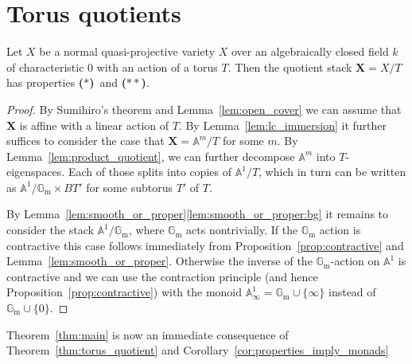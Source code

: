 \documentclass{oupau}
\theoremstyle{remark}
\newcommand\as[2][]{\mathbb A^{#2}_{#1}}    %
\newcommand\Gm{\mathbb{G}_{\mathrm{m}}}     %
\let\stack\mathbf                           %
\newcommand\bc{\textbf{($\mathbf{*}$)}}
\newcommand\hbc{\textbf{($\mathbf{**}$)}}
\begin{document}
\section{Torus quotients}\label{sec:torus}

\begin{theorem}\label{thm:torus_quotient}
    Let $X$ be a normal quasi-projective variety $X$ over an algebraically closed field $k$ of characteristic $0$ with an action of a torus $T$.
    Then the quotient stack $\stack X = X/T$ has properties \bc\ and \hbc.
\end{theorem}

\begin{proof}
  By Sumihiro's theorem \cite{Sumihiro:1974:EquivariantCompletions} and Lemma~\ref{lem:open_cover} we can assume that $\stack X$ is affine with a linear action of $T$.
  By Lemma~\ref{lem:lc_immersion} it further suffices to consider the case that $\stack X = \as{m}/T$ for some $m$.
  By Lemma~\ref{lem:product_quotient}, we can further decompose $\as{m}$ into $T$-eigenspaces.
  Each of those splits into copies of $\as{1}/T$, which in turn can be written as $\as{1}/\Gm \times BT'$ for some subtorus $T'$ of $T$.
  
  By Lemma~\ref{lem:smooth_or_proper}\ref{lem:smooth_or_proper:bg} it remains to consider the stack $\as{1}/\Gm$, where $\Gm$ acts nontrivially.
  If the $\Gm$ action is contractive this case follows immediately from Proposition~\ref{prop:contractive} and Lemma~\ref{lem:smooth_or_proper}.
  Otherwise the inverse of the $\Gm$-action on $\as1$ is contractive and we can use the contraction principle (and hence Proposition~\ref{prop:contractive}) with the monoid $\as[\infty]{1} = \Gm \cup \{\infty\}$ instead of $\Gm \cup \{0\}$.
\end{proof}

Theorem~\ref{thm:main} is now an immediate consequence of Theorem~\ref{thm:torus_quotient} and Corollary~\ref{cor:properties_imply_monads}
\end{document}
